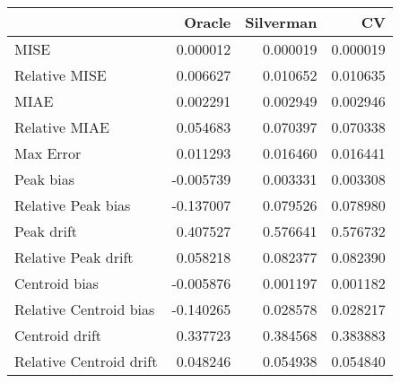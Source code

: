 \begin{tabular}{lrrr}
  \hline
 & Oracle & Silverman & CV \\ 
  \hline
MISE & 0.000012 & 0.000019 & 0.000019 \\ 
  Relative MISE & 0.006627 & 0.010652 & 0.010635 \\ 
  MIAE & 0.002291 & 0.002949 & 0.002946 \\ 
  Relative MIAE & 0.054683 & 0.070397 & 0.070338 \\ 
  Max Error & 0.011293 & 0.016460 & 0.016441 \\ 
  Peak bias & -0.005739 & 0.003331 & 0.003308 \\ 
  Relative Peak bias & -0.137007 & 0.079526 & 0.078980 \\ 
  Peak drift & 0.407527 & 0.576641 & 0.576732 \\ 
  Relative Peak drift & 0.058218 & 0.082377 & 0.082390 \\ 
  Centroid bias & -0.005876 & 0.001197 & 0.001182 \\ 
  Relative Centroid bias & -0.140265 & 0.028578 & 0.028217 \\ 
  Centroid drift & 0.337723 & 0.384568 & 0.383883 \\ 
  Relative Centroid drift & 0.048246 & 0.054938 & 0.054840 \\ 
   \hline
\end{tabular}

